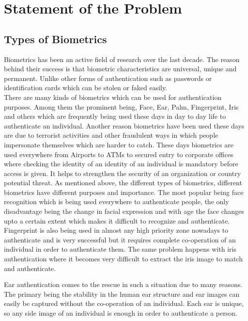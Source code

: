 \chapter{Statement of the Problem}
\label{sec:problem}

\section{Types of Biometrics} Biometrics has been an active field of research over the last decade. The reason behind their success is that biometric characteristics are universal, unique and permanent. Unlike other forms of authentication such as passwords or identification cards which can be stolen or faked easily.\\

There are many kinds of biometrics which can be used for authentication purposes. Among them the prominent being, Face, Ear, Palm, Fingerprint, Iris and others which are frequently being used these days in day to day life to authenticate an individual. Another reason biometrics have been used these days are due to terrorist activities and other fraudulent ways in which people impersonate themselves which are harder to catch. These days biometrics are used everywhere from Airports to ATMs to secured entry to corporate offices where checking the identity of an identity of an individual is mandatory before access is given. It helps to strengthen the security of an organization or country potential threat. As mentioned above, the different types of biometrics, different biometrics have different purposes and importance. The most popular being face recognition which is being used everywhere to authenticate people, the only disadvantage being the change in facial expression and with age the face changes upto a certain extent which makes it difficult to recognize and authenticate. Fingerprint is also being used in almost any high priority zone nowadays to authenticate and is very successful but it requires complete co-operation of an individual in order to authenticate them. The same problem happens with iris authentication where it becomes very difficult to extract the iris image to match and authenticate. 

Ear authentication comes to the rescue in such a situation due to many reasons. The primary being the stability in the human ear structure and ear images can easily be captured without the co-operation of an individual. Each ear is unique, so any side image of an individual is enough in order to authenticate a person.


